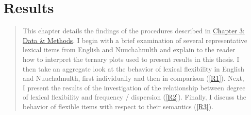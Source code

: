 \chapter{Results}
\label{ch:results}

\blockquote{This chapter details the findings of the procedures described in \hyperref[ch:methods]{Chapter 3: Data \& Methods}. I begin with a brief examination of several representative lexical items from English and Nuuchahnulth and explain to the reader how to interpret the ternary plots used to present results in this thesis. I then take an aggregate look at the behavior of lexical flexibility in English and Nuuchahnulth, first individually and then in comparison (\ref{R1}). Next, I present the results of the investigation of the relationship between degree of lexical flexibility and frequency / dispersion (\ref{R2}). Finally, I discuss the behavior of flexible items with respect to their semantics (\ref{R3}).}
